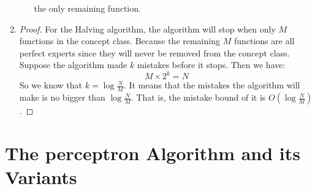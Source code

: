 \documentclass{article}
\begin{document}
\begin{enumerate}
\begin{enumerate}
\begin{algorithm}[H]
\begin{algorithmic}[1]
			\State \Return the only remaining function.
        \end{algorithmic}
        \end{algorithm}
		\end{enumerate}
	\item \begin{proof}
		For the Halving algorithm, the algorithm will stop when only $M$ functions in the concept class. Because the remaining  $M$ functions are all perfect experts since they will never be removed from the concept class. Suppose the algorithm made $k$ mistakes before it stops. Then we have:
		\begin{equation}
			M \times 2^k = N
		\end{equation}
		So we know that $k = \log{\frac{N}{M}}$. It means that the mistakes the algorithm will make is no bigger than $\log{\frac{N}{M}}$. That is, the mistake bound of it is $O(\log{\frac{N}{M}})$.
	\end{proof}
	\end{enumerate}
	\section{The perceptron Algorithm and its Variants}
	
	
\end{document}
